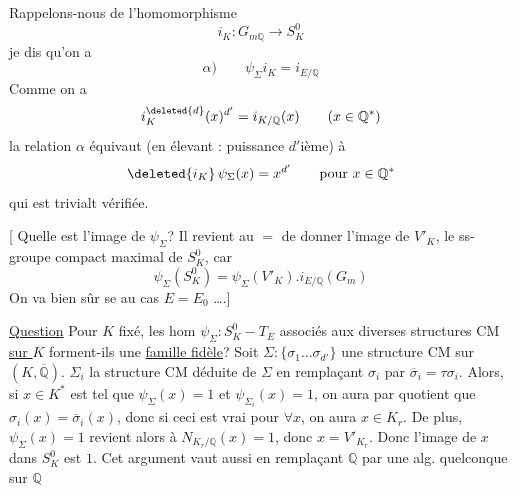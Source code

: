 Rappelons-nous de l'homomorphisme
\[
i_K:G_{m\mathbb Q}\longrightarrow S_K^0
\]
je dis qu'on a
\[
\alpha)\qquad\boxed{\psi_\Sigma i_K=i_{E/\mathbb Q}}
\]
Comme on a
\[
i_K^{\deleted{d}}(x)^{d'}=i_{K/\mathbb Q}(x)\qquad(x\in\mathbb Q^*)
\]
la relation $\alpha$ équivaut (en élevant : puissance $d'$ième) à
\[
\deleted{i_K}\,\psi_\Sigma(x)=x^{d'}\qquad\text{pour }x\in\mathbb Q^*
\]
qui est trivialt vérifiée.

[ Quelle est l'image de $\psi_\Sigma$? Il revient au $=$ de
donner l'image de $V'_K$, le ss-groupe compact maximal de $S_K^0$, car
\[
\psi_\Sigma(S_K^0)=\psi_\Sigma(V'_K).i_{E/\mathbb Q}(G_m)
\]
On va bien sûr se   au cas
$E=E_0$ \ldots.]

\uline{Question} Pour $K$ fixé,  les hom $\psi_\Sigma:S_K^0-T_E$ associés aux diverses
structures CM \uline{sur $K$}  forment-ils une \uline{famille fidèle}?
Soit $\Sigma:\{\sigma_1\ldots\sigma_{d'}\}$ une structure CM sur $(K,\overline{\mathbb Q})$.
 
$\Sigma_i$  la structure CM déduite de $\Sigma$ en remplaçant
$\sigma_i$ par $\overline\sigma_i=\tau\sigma_i$. Alors, si $x\in K^*$ est tel que
$\psi_\Sigma(x)=1$ et $\psi_{\Sigma_i}(x)=1$, on aura par quotient que
$\sigma_i(x)=\overline\sigma_i(x)$, donc si ceci est vrai pour $\forall x$,
on aura $x\in K_r$. De plus,  $\psi_\Sigma(x)=1$ revient alors à
$N_{K_r/\mathbb Q}(x)=1$, donc $x=V'_{K_r}$.
Donc l'image de $x$ dans $S_K^0$ est $1$.
Cet argument vaut aussi en remplaçant $\mathbb Q$ par une alg. quelconque sur $\mathbb Q$
\deleted{[car $\bigcap\operatorname{Ker}(\sigma_i,\overline\sigma_i)=K_r$ est
stable par}

